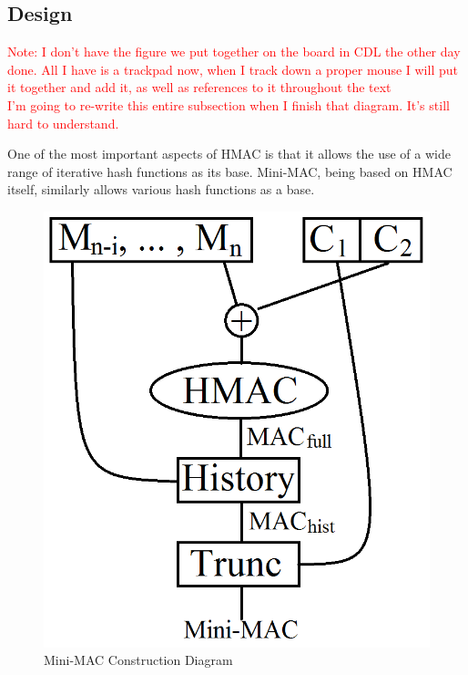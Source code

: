 	
\subsection{Design}

\textcolor{red}{Note: I don't have the figure we put together on the board in CDL the other day done. All I have is a trackpad now, when I track down a proper mouse I will put it together and add it, as well as references to it throughout the text\\ I'm going to re-write this entire subsection when I finish that diagram. It's still hard to understand.}

One of the most important aspects of HMAC is that it allows the use of a wide range of iterative hash functions as its base. Mini-MAC, being based on HMAC itself, similarly allows various hash functions as a base.

	\begin{figure}
		\centering
		\includegraphics[width=\columnwidth]{figures/minimac_diagram.png}
		\caption{Mini-MAC Construction Diagram}
	\end{figure}


